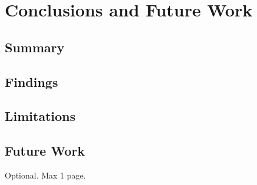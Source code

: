 \documentclass[12pt,a4paper,openright,twoside]{book}
\begin{document}
\chapter{Conclusions and Future Work}
\label{chap:conclusions}

\section{Summary}

\section{Findings}

\section{Limitations}

\section{Future Work}

\backmatter

\nocite{*} %




\begin{acknowledgements}
Optional. Max 1 page.
\end{acknowledgements}
\end{document}
